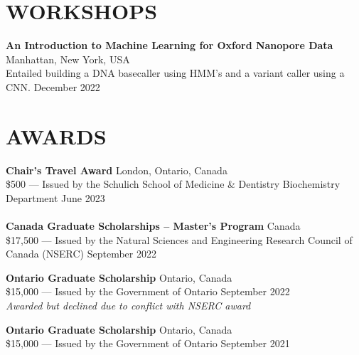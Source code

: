 \documentclass[a4paper,9pt]{extarticle}
\begin{document}
\section*{WORKSHOPS}
\begin{minipage}{1\textwidth}
\setlength{\parindent}{15pt} %
	\noindent
	\textbf{An Introduction to Machine Learning for Oxford Nanopore Data}  \hfill Manhattan, New York, USA\\ 
	Entailed building a DNA basecaller using HMM's and a variant caller using a CNN.  \hfill December 2022
\end{minipage}

\section*{AWARDS}
\noindent
\begin{minipage}{1\textwidth}
\setlength{\parindent}{15pt} %
	\noindent
	\textbf{Chair's Travel Award}  \hfill London, Ontario, Canada\\ 
	\$500 --- Issued by the Schulich School of Medicine \& Dentistry Biochemistry Department \hfill June 2023\\ \\
	\textbf{Canada Graduate Scholarships -- Master's Program}  \hfill Canada\\ 
	\$17,500 --- Issued by the Natural Sciences and Engineering Research Council of Canada (NSERC) \hfill September 2022\\ 
\end{minipage}

\noindent
\begin{minipage}{1\textwidth}
\setlength{\parindent}{15pt} %
	\noindent
	\textbf{Ontario Graduate Scholarship}  \hfill Ontario, Canada\\ 
	\$15,000 --- Issued by the Government of Ontario \hfill September 2022\\ 
	\textit{Awarded but declined due to conflict with NSERC award}\\ 
\end{minipage}

\noindent
\begin{minipage}{1\textwidth}
\setlength{\parindent}{15pt} %
	\noindent
	\textbf{Ontario Graduate Scholarship}  \hfill Ontario, Canada\\ 
	\$15,000 --- Issued by the Government of Ontario \hfill September 2021\\ 
\end{minipage}
\end{document}
